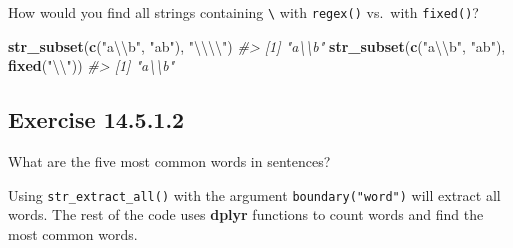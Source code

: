 \documentclass[]{book}
\newenvironment{Shaded}{\begin{snugshade}}{\end{snugshade}}
\newcommand{\CharTok}[1]{\textcolor[rgb]{0.31,0.60,0.02}{#1}}
\newcommand{\CommentTok}[1]{\textcolor[rgb]{0.56,0.35,0.01}{\textit{#1}}}
\newcommand{\DataTypeTok}[1]{\textcolor[rgb]{0.13,0.29,0.53}{#1}}
\newcommand{\DecValTok}[1]{\textcolor[rgb]{0.00,0.00,0.81}{#1}}
\newcommand{\KeywordTok}[1]{\textcolor[rgb]{0.13,0.29,0.53}{\textbf{#1}}}
\newcommand{\NormalTok}[1]{#1}
\newcommand{\OperatorTok}[1]{\textcolor[rgb]{0.81,0.36,0.00}{\textbf{#1}}}
\newcommand{\OtherTok}[1]{\textcolor[rgb]{0.56,0.35,0.01}{#1}}
\newcommand{\StringTok}[1]{\textcolor[rgb]{0.31,0.60,0.02}{#1}}
\theoremstyle{plain}
\theoremstyle{remark}
\begin{document}
How would you find all strings containing \texttt{\textbackslash{}} with \texttt{regex()} vs.~with \texttt{fixed()}?

\begin{Shaded}
\begin{Highlighting}[]
\KeywordTok{str_subset}\NormalTok{(}\KeywordTok{c}\NormalTok{(}\StringTok{"a}\CharTok{\textbackslash{}\textbackslash{}}\StringTok{b"}\NormalTok{, }\StringTok{"ab"}\NormalTok{), }\StringTok{"}\CharTok{\textbackslash{}\textbackslash{}\textbackslash{}\textbackslash{}}\StringTok{"}\NormalTok{)}
\CommentTok{#> [1] "a\textbackslash{}\textbackslash{}b"}
\KeywordTok{str_subset}\NormalTok{(}\KeywordTok{c}\NormalTok{(}\StringTok{"a}\CharTok{\textbackslash{}\textbackslash{}}\StringTok{b"}\NormalTok{, }\StringTok{"ab"}\NormalTok{), }\KeywordTok{fixed}\NormalTok{(}\StringTok{"}\CharTok{\textbackslash{}\textbackslash{}}\StringTok{"}\NormalTok{))}
\CommentTok{#> [1] "a\textbackslash{}\textbackslash{}b"}
\end{Highlighting}
\end{Shaded}

\hypertarget{exercise-14.5.1.2}{%
\subsection*{\texorpdfstring{Exercise {14.5.1.2}}{Exercise 14.5.1.2}}\label{exercise-14.5.1.2}}

What are the five most common words in sentences?

Using \texttt{str\_extract\_all()} with the argument \texttt{boundary("word")} will extract all words.
The rest of the code uses \textbf{dplyr} functions to count words and find the most
common words.

\begin{Shaded}
\end{Shaded}
\end{document}
